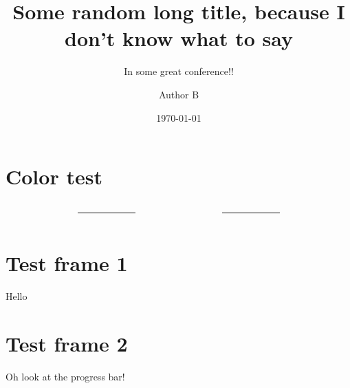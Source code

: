 \documentclass[%
    listings={
        Lean=listings-lean,
        Go
    },
	withappendix,
]{custom}
\title[Short title]{Some random long title, because I don't know what to say}
\subtitle{In some great conference!!}
\author[\speaker{A} \and B]{\speaker{Speaker A}\and Author B}
\date{\today}
\begin{document}
\section{Color test}
\begin{sframe}
	\footnotesize
	\sffamily
	\begin{columns}
		\begin{column}{.27\linewidth}
			\begin{testcolors}[HTML]
			\end{testcolors}
		\end{column}
		\begin{column}{.05\linewidth}
			\centering
			\rule{.1mm}{.7\textheight}
		\end{column}
		\begin{column}{.27\linewidth}
			\begin{testcolors}[HTML]
			\end{testcolors}
		\end{column}
		\begin{column}{.05\linewidth}
			\centering
			\rule{.1mm}{.7\textheight}
		\end{column}
		\begin{column}{.27\linewidth}
			\begin{testcolors}[HTML]
			\end{testcolors}
		\end{column}
	\end{columns}
\end{sframe}

\section{Test frame 1}
\begin{sframe}
	Hello
\end{sframe}

\section{Test frame 2}
\begin{sframe}
	Oh look at the progress bar!
\end{sframe}
\end{document}

